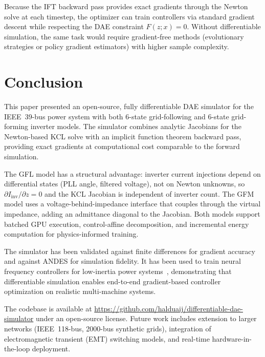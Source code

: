 \documentclass[11pt]{article}
\begin{document}
Because the IFT backward pass provides exact gradients through the
Newton solve at each timestep, the optimizer can train controllers via
standard gradient descent while respecting the DAE constraint
$F(z; x) = 0$.  Without differentiable simulation, the same task
would require gradient-free methods (evolutionary strategies or policy
gradient estimators) with higher sample complexity.

\section{Conclusion}
\label{sec:conclusion}

This paper presented an open-source, fully differentiable DAE
simulator for the IEEE~39-bus power system with both 6-state
grid-following and 6-state grid-forming inverter models.  The
simulator combines analytic Jacobians for the Newton-based KCL solve
with an implicit function theorem backward pass, providing exact
gradients at computational cost comparable to the forward simulation.

The GFL model has a structural advantage: inverter current injections
depend on differential states (PLL angle, filtered voltage), not on
Newton unknowns, so $\partial I_{\mathrm{inv}}/\partial z = 0$ and
the KCL Jacobian is independent of inverter count.  The GFM model
uses a voltage-behind-impedance interface that couples through the
virtual impedance, adding an admittance diagonal to the Jacobian.
Both models support batched GPU execution, control-affine
decomposition, and incremental energy computation for physics-informed
training.

The simulator has been validated against finite differences for
gradient accuracy and against ANDES for simulation fidelity.  It has
been used to train neural frequency controllers for low-inertia power
systems~\cite{AlduaijWeng25SGC, AlduaijWengLi25BeyondMonotonic},
demonstrating that differentiable simulation enables end-to-end
gradient-based controller optimization on realistic multi-machine
systems.

The codebase is available at \url{https://github.com/halduaij/differentiable-dae-simulator}
under an open-source license.  Future work includes extension to
larger networks (IEEE~118-bus, 2000-bus synthetic grids), integration
of electromagnetic transient (EMT) switching models, and real-time
hardware-in-the-loop deployment.



\end{document}
